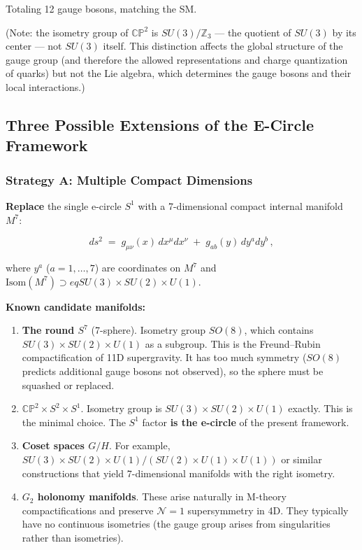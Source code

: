 \documentclass[aps,prd,preprint,superscriptaddress,longbibliography,floatfix]{revtex4-2}
\theoremstyle{remark}
\begin{document}
Totaling 12 gauge bosons, matching the SM.

(Note: the isometry group of $\mathbb{CP}^2$ is $SU(3)/\mathbb{Z}_3$ --- the quotient of $SU(3)$ by its center --- not $SU(3)$ itself. This distinction affects the global structure of the gauge group (and therefore the allowed representations and charge quantization of quarks) but not the Lie algebra, which determines the gauge bosons and their local interactions.)



\subsection{Three Possible Extensions of the E-Circle Framework}


\subsubsection{Strategy A: Multiple Compact Dimensions}

\textbf{Replace} the single e-circle $S^1$ with a 7-dimensional compact internal manifold $M^7$:


\begin{equation}
    ds^2 \;=\; g_{\mu\nu}(x)\, dx^\mu dx^\nu
\;+\; g_{ab}(y)\, dy^a dy^b \,,
\end{equation}

where $y^a$ ($a = 1, \ldots, 7$) are coordinates on $M^7$ and $\text{Isom}(M^7) \supset eq SU(3) \times SU(2) \times U(1)$.

\textbf{Known candidate manifolds:}


\begin{enumerate}
  \item \textbf{The round $S^7$} (7-sphere). Isometry group $SO(8)$, which contains $SU(3) \times SU(2) \times U(1)$ as a subgroup. This is the Freund--Rubin compactification of 11D supergravity. It has too much symmetry ($SO(8)$ predicts additional gauge bosons not observed), so the sphere must be squashed or replaced.
  \item \textbf{$\mathbb{CP}^2 \times S^2 \times S^1$}. Isometry group is $SU(3) \times SU(2) \times U(1)$ exactly. This is the minimal choice. The $S^1$ factor \textbf{is the e-circle} of the present framework.
  \item \textbf{Coset spaces $G/H$}. For example, $SU(3) \times SU(2) \times U(1) / (SU(2) \times U(1) \times U(1))$ or similar constructions that yield 7-dimensional manifolds with the right isometry.
  \item \textbf{$G_2$ holonomy manifolds}. These arise naturally in M-theory compactifications and preserve $\mathcal{N} = 1$ supersymmetry in 4D. They typically have no continuous isometries (the gauge group arises from singularities rather than isometries).
\end{enumerate}
\end{document}
